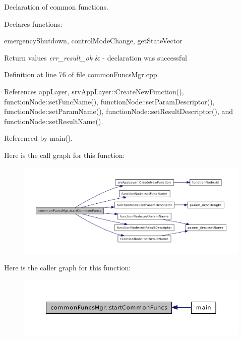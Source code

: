 Declaration of common functions. 

Declares functions:


\begin{DoxyItemize}
\item emergencyShutdown, controlModeChange, getStateVector 
\begin{DoxyRetVals}{Return values}
{\em err\_\-result\_\-ok} & -\/ declaration was successful \\
\hline
\end{DoxyRetVals}

\end{DoxyItemize}

Definition at line 76 of file commonFuncsMgr.cpp.



References appLayer, srvAppLayer::CreateNewFunction(), functionNode::setFuncName(), functionNode::setParamDescriptor(), functionNode::setParamName(), functionNode::setResultDescriptor(), and functionNode::setResultName().



Referenced by main().



Here is the call graph for this function:\nopagebreak
\begin{figure}[H]
\begin{center}
\leavevmode
\includegraphics[width=400pt]{d8/d5d/classcommonFuncsMgr_a9bd0bd8c733b05611a2d013811b45351_cgraph}
\end{center}
\end{figure}




Here is the caller graph for this function:\nopagebreak
\begin{figure}[H]
\begin{center}
\leavevmode
\includegraphics[width=388pt]{d8/d5d/classcommonFuncsMgr_a9bd0bd8c733b05611a2d013811b45351_icgraph}
\end{center}
\end{figure}


